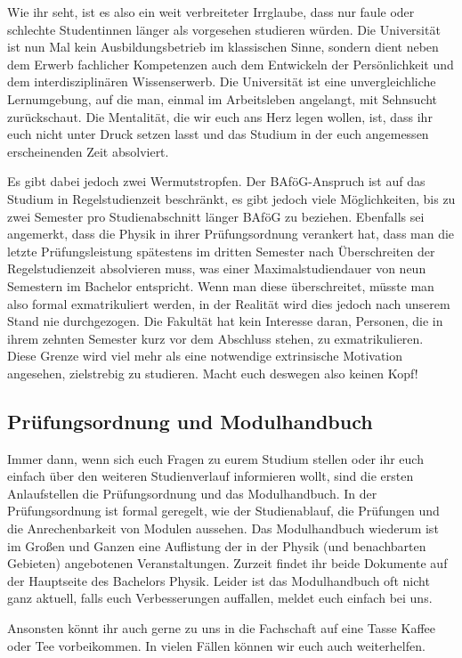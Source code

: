 Wie ihr seht, ist es also ein weit verbreiteter Irrglaube, dass nur faule oder schlechte Studentinnen länger als vorgesehen studieren würden. Die Universität ist nun Mal kein Ausbildungsbetrieb im klassischen Sinne, sondern dient neben dem Erwerb fachlicher Kompetenzen auch dem Entwickeln der Persönlichkeit und dem interdisziplinären Wissenserwerb. Die Universität ist eine unvergleichliche Lernumgebung, auf die man, einmal im Arbeitsleben angelangt, mit Sehnsucht zurückschaut. Die Mentalität, die wir euch ans Herz legen wollen, ist, dass ihr euch nicht unter Druck setzen lasst und das Studium in der euch angemessen erscheinenden Zeit absolviert.

Es gibt dabei jedoch zwei Wermutstropfen. Der BAföG-Anspruch ist auf das Studium in Regelstudienzeit beschränkt, es gibt jedoch viele Möglichkeiten, bis zu zwei Semester pro Studienabschnitt länger BAföG zu beziehen. Ebenfalls sei angemerkt, dass die Physik in ihrer Prüfungsordnung verankert hat, dass man die letzte Prüfungsleistung spätestens im dritten Semester nach Überschreiten der Regelstudienzeit absolvieren muss, was einer Maximalstudiendauer von neun Semestern im Bachelor entspricht. Wenn man diese überschreitet, müsste man also formal exmatrikuliert werden, in der Realität wird dies jedoch nach unserem Stand nie durchgezogen. Die Fakultät hat kein Interesse daran, Personen, die in ihrem zehnten Semester kurz vor dem Abschluss stehen, zu exmatrikulieren. Diese Grenze wird viel mehr als eine notwendige extrinsische Motivation angesehen, zielstrebig zu studieren. Macht euch deswegen also keinen Kopf!

\subsection{Prüfungsordnung und Modulhandbuch}

\begin{figure}[b]
\end{figure}

Immer dann, wenn sich euch Fragen zu eurem Studium stellen oder ihr euch einfach über den weiteren Studienverlauf informieren wollt, sind die ersten Anlaufstellen die Prüfungsordnung und das Modulhandbuch. In der Prüfungsordnung ist formal geregelt, wie der Studienablauf, die Prüfungen und die Anrechenbarkeit von Modulen aussehen. Das Modulhandbuch wiederum ist im Großen und Ganzen eine Auflistung der in der Physik (und benachbarten Gebieten) angebotenen Veranstaltungen. Zurzeit findet ihr beide Dokumente auf der Hauptseite des Bachelors Physik. Leider ist das Modulhandbuch oft nicht ganz aktuell, falls euch Verbesserungen auffallen, meldet euch einfach bei uns.

Ansonsten könnt ihr auch gerne zu uns in die Fachschaft auf eine Tasse Kaffee oder Tee vorbeikommen. In vielen Fällen können wir euch auch weiterhelfen.
